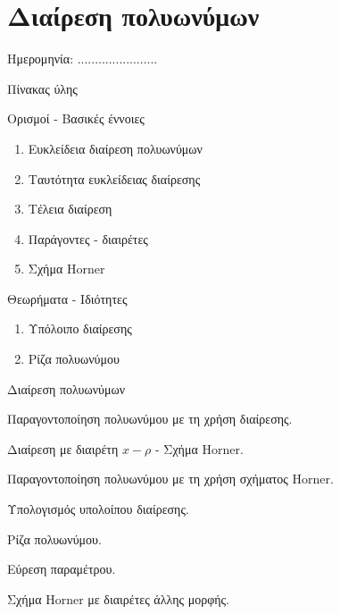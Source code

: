 \documentclass[twoside,nofonts,internet,math,spyros]{frontisthrio}
\newcommand{\myitem}{\stepcounter{enumi}\item[\raisebox{0.5mm}{\faExclamationTriangle}\ \Large$\square$]}
\begin{document}
\newpage
\section{Διαίρεση πολυωνύμων}
\begin{flushright}
\faCalendar* Ημερομηνία: .......................
\end{flushright}
\begin{mybox}[mysubtitle]{Πίνακας ύλης}
\begin{tcbraster}[raster columns=2,raster equal height]
\begin{myleftbox}{Ορισμοί - Βασικές έννοιες\ \ \faBook}
\begin{enumerate}[itemsep=0mm]
\item Ευκλείδεια διαίρεση πολυωνύμων
\item Ταυτότητα ευκλείδειας διαίρεσης
\item Τέλεια διαίρεση
\item Παράγοντες - διαιρέτες
\item Σχήμα Horner
\end{enumerate}
\end{myleftbox}
\begin{myrightbox}{Θεωρήματα - Ιδιότητες\ \ \faTools}
\begin{enumerate}[itemsep=0mm]
\item Υπόλοιπο διαίρεσης
\item Ρίζα πολυωνύμου
\end{enumerate}
\end{myrightbox}
\end{tcbraster}
\begin{multicols}{2}
\begin{todolist}[itemsep=0mm]
\item Διαίρεση πολυωνύμων
\item Παραγοντοποίηση πολυωνύμου με τη χρήση διαίρεσης.
\myitem Διαίρεση με διαιρέτη $x-\rho$ - Σχήμα Horner.
\myitem Παραγοντοποίηση πολυωνύμου με τη χρήση σχήματος Horner.
\item Υπολογισμός υπολοίπου διαίρεσης.
\item Ρίζα πολυωνύμου.
\item Εύρεση παραμέτρου.
\item Σχήμα Horner με διαιρέτες άλλης μορφής.
\end{todolist}
\end{multicols}
\begin{multicols}{2}

\end{multicols}
\end{mybox}
\end{document}
